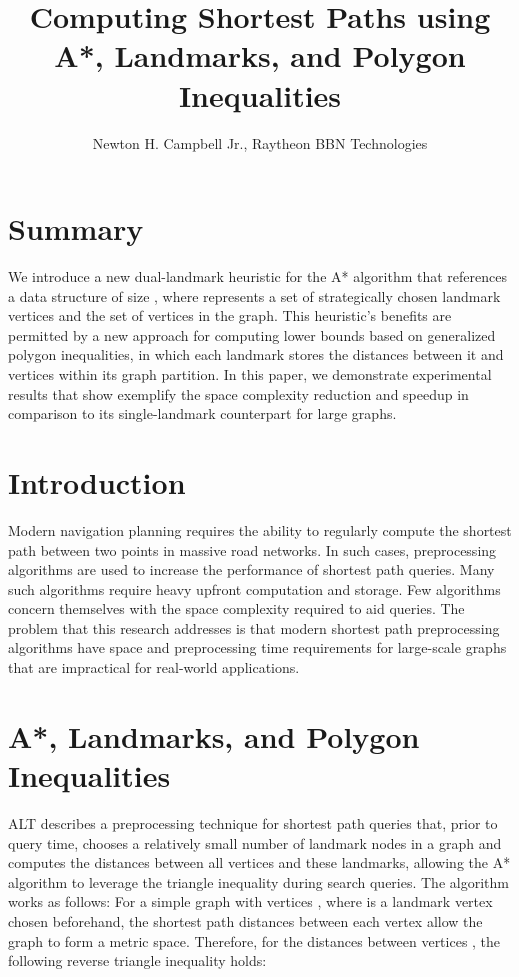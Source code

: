 \documentclass{siam-wns-article}
\title{Computing Shortest Paths using A*, Landmarks, and Polygon Inequalities}
\author{Newton H. Campbell Jr., Raytheon BBN Technologies}
\begin{document}
\maketitle

\section*{Summary}
We introduce a new dual-landmark heuristic for the A* algorithm that references a data structure of size , where  represents a set of strategically chosen landmark vertices and  the set of vertices in the graph. This heuristic's benefits are permitted by a new approach for computing lower bounds based on generalized polygon inequalities, in which each landmark stores the distances between it and vertices within its graph partition. In this paper, we demonstrate experimental results that show exemplify the space complexity reduction and speedup in comparison to its single-landmark counterpart for large graphs.
\section{Introduction}
Modern navigation planning requires the ability to regularly compute the shortest path between two points in massive road networks. In such cases, preprocessing algorithms are used to increase the performance of shortest path  queries. Many such algorithms require heavy upfront computation and storage. Few algorithms concern themselves with the space complexity required to aid queries. The problem that this research addresses is that modern shortest path preprocessing algorithms have space and preprocessing time requirements for large-scale graphs that are impractical for real-world applications.
\section{A*, Landmarks, and Polygon Inequalities}
ALT \cite{GoldbergHarrelson2005} describes a preprocessing technique for shortest path queries that, prior to query time, chooses a relatively small number of landmark nodes in a graph and computes the distances between all vertices and these landmarks, allowing the A* algorithm to leverage the triangle inequality during search queries. The algorithm works as follows:
For a simple graph  with vertices , where  is a landmark vertex chosen beforehand, the shortest path distances between each vertex allow the graph to form a metric space. Therefore, for the distances between vertices , the following reverse triangle inequality holds:
\end{document}
